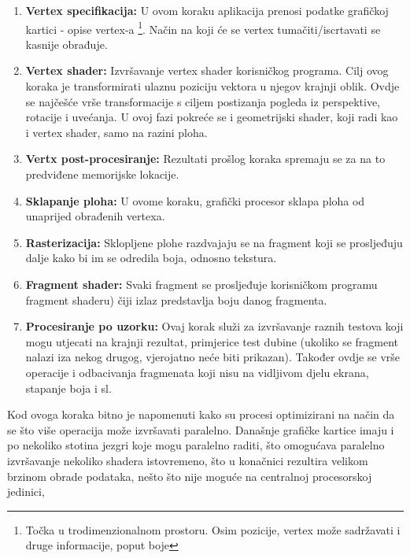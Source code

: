 \begin{enumerate}
\item \textbf{Vertex specifikacija:} U ovom koraku aplikacija prenosi podatke grafičkoj kartici - opise vertex-a \footnote{Točka u trodimenzionalnom prostoru. Osim pozicije, vertex može sadržavati i druge informacije, poput boje}. Način na koji će se vertex tumačiti/iscrtavati se kasnije obrađuje.

\item \textbf{Vertex shader:} Izvršavanje vertex shader korisničkog programa. Cilj ovog koraka je transformirati ulaznu poziciju vektora u njegov krajnji oblik. Ovdje se najčešće vrše transformacije s ciljem postizanja pogleda iz perspektive, rotacije i uvećanja. U ovoj fazi pokreće se i geometrijski shader, koji radi kao i vertex shader, samo na razini ploha.

\item \textbf{Vertx post-procesiranje:} Rezultati prošlog koraka spremaju se za na to predviđene memorijske lokacije.

\item \textbf{Sklapanje ploha:} U ovome koraku, grafički procesor sklapa ploha od unaprijed obrađenih vertexa.

\item \textbf{Rasterizacija:} Sklopljene plohe razdvajaju se na fragment koji se prosljeđuju dalje kako bi im se odredila boja, odnosno tekstura.

\item \textbf{Fragment shader:} Svaki fragment se prosljeđuje korisničkom programu fragment shaderu) čiji izlaz predstavlja boju danog fragmenta.

\item \textbf{Procesiranje po uzorku:} Ovaj korak služi za izvršavanje raznih testova koji mogu utjecati na krajnji rezultat, primjerice test dubine (ukoliko se fragment nalazi iza nekog drugog, vjerojatno neće biti prikazan). Također ovdje se vrše operacije i odbacivanja fragmenata koji nisu na vidljivom djelu ekrana, stapanje boja i sl.

\end{enumerate}

Kod ovoga koraka bitno je napomenuti kako su procesi optimizirani na način da se što više operacija može izvršavati paralelno. Današnje grafičke kartice imaju i po nekoliko stotina jezgri koje mogu paralelno raditi, što omogućava paralelno izvršavanje nekoliko shadera istovremeno, što u konačnici rezultira velikom brzinom obrade podataka, nešto što nije moguće na centralnoj procesorskoj jedinici,

